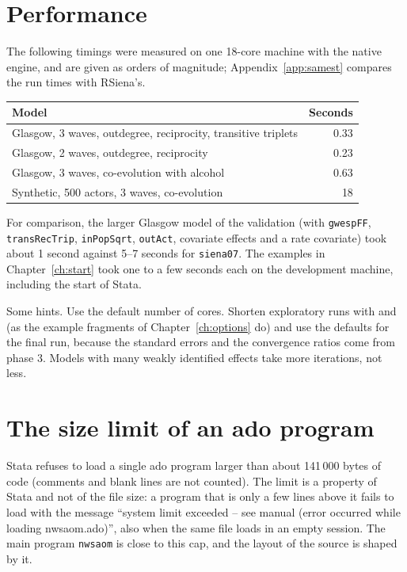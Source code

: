 \section{Performance}

The following timings were measured on one 18-core machine with the native engine, and are given as orders of magnitude; Appendix~\ref{app:samest} compares the run times with RSiena's.

\begin{center}
\small
\begin{tabular}{@{}lr@{}}
\toprule
Model & Seconds \\
\midrule
Glasgow, 3 waves, outdegree, reciprocity, transitive triplets & 0.33 \\
Glasgow, 2 waves, outdegree, reciprocity & 0.23 \\
Glasgow, 3 waves, co-evolution with alcohol & 0.63 \\
Synthetic, 500 actors, 3 waves, co-evolution & 18 \\
\bottomrule
\end{tabular}
\end{center}
For comparison, the larger Glasgow model of the validation (with \texttt{gwespFF}, \texttt{transRecTrip}, \texttt{inPopSqrt}, \texttt{outAct}, covariate effects and a rate covariate) took \nwsaom{} about 1 second against 5--7 seconds for \texttt{siena07}. The examples in Chapter~\ref{ch:start} took one to a few seconds each on the development machine, including the start of Stata.

Some hints. Use the default number of cores. Shorten exploratory runs with  and  (as the example fragments of Chapter~\ref{ch:options} do) and use the defaults for the final run, because the standard errors and the convergence ratios come from phase 3. Models with many weakly identified effects take more iterations, not less.

\section{The size limit of an ado program}

Stata refuses to load a single ado program larger than about 141\,000 bytes of code (comments and blank lines are not counted). The limit is a property of Stata and not of the file size: a program that is only a few lines above it fails to load with the message ``system limit exceeded -- see manual (error occurred while loading nwsaom.ado)'', also when the same file loads in an empty session. The main program \texttt{nwsaom} is close to this cap, and the layout of the source is shaped by it.

